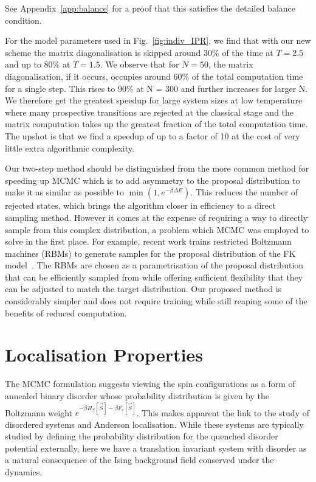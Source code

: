See Appendix~\ref{app:balance} for a proof that this satisfies the detailed balance condition.

For the model parameters used in Fig.~\ref{fig:indiv_IPR}, we find that with our new scheme the matrix diagonalisation is skipped around 30\% of the time at \(T = 2.5\) and up to 80\% at \(T = 1.5\). We observe that for  \(N = 50\), the matrix diagonalisation, if it occurs, occupies around 60\% of the total computation time for a single step. This rises to 90\% at N = 300 and further increases for larger N. We therefore get the greatest speedup for large system sizes at low temperature where many prospective transitions are rejected at the classical stage and the matrix computation takes up the greatest fraction of the total computation time. The upshot is that we find a  speedup of up to a factor of 10 at the cost of very little extra algorithmic complexity. 

Our two-step method should be distinguished from the more common method for speeding up \ac{MCMC} which is to add asymmetry to the proposal distribution to make it as similar as possible to \(\min\left(1, e^{-\beta \Delta E}\right)\). This reduces the number of rejected states, which brings the algorithm closer in efficiency to a direct sampling method. However it comes at the expense of requiring a way to directly sample from this complex distribution, a problem which \ac{MCMC} was employed to solve in the first place. For example, recent work trains restricted Boltzmann machines (RBMs) to generate samples for the proposal distribution of the \ac{FK} model~\cite{huangAcceleratedMonteCarlo2017}. The RBMs are chosen as a parametrisation of the proposal distribution that can be efficiently sampled from while offering sufficient flexibility that they can be adjusted to match the target distribution. Our proposed method is considerably simpler and does not require training while still reaping some of the benefits of reduced computation.

\section{Localisation Properties}

The \ac{MCMC} formulation suggests viewing the spin configurations as a form of annealed binary disorder whose probability distribution is given by the Boltzmann weight \(e^{-\beta H_S[\vec{S}] - \beta F_c[\vec{S}]}\). This makes apparent the link to the study of disordered systems and Anderson localisation. While these systems are typically studied by defining the probability distribution for the quenched disorder potential externally, here we have a translation invariant system with disorder as a natural consequence of the Ising background field conserved under the dynamics.  
%

